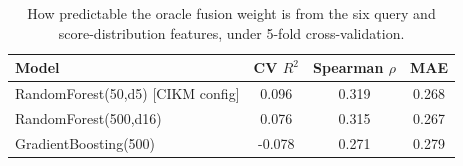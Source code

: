 \begin{table}[t]
\centering
\small
\caption{How predictable the oracle fusion weight is from the six query and score-distribution features, under 5-fold cross-validation.}
\label{tab:alpha_predictability}
\begin{tabular}{lccc}
\toprule
Model & CV $R^2$ & Spearman $\rho$ & MAE \\
\midrule
RandomForest(50,d5) [CIKM config] & 0.096 & 0.319 & 0.268 \\
RandomForest(500,d16) & 0.076 & 0.315 & 0.267 \\
GradientBoosting(500) & -0.078 & 0.271 & 0.279 \\
\bottomrule
\end{tabular}
\end{table}
